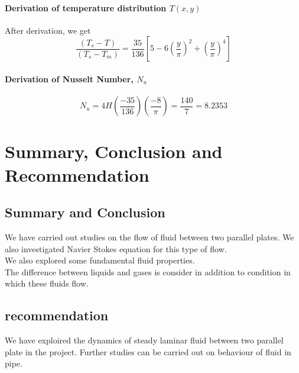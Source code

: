 \documentclass[12pt]{report}
\newcommand{\sps}{\\[0.2cm]}
\begin{document}
	\subsubsection{Derivation of temperature distribution $T(x,y)$}
	After derivation, we get
	\begin{equation*}
		\frac{(T_s - T)}{(T_s - T_m)} = \frac{35}{136}\left[5 - 6\left(\frac{y}{\pi}\right)^2 + \left(\frac{y}{\pi}\right)^4\right]
	\end{equation*}
	
	\subsubsection{Derivation of Nusselt Number, $N_u$}
	\begin{equation*}
		N_u = 4H\left(\frac{-35}{136}\right)\left(\frac{-8}{\pi}\right) = \frac{140}{7} = 8.2353
	\end{equation*}
	
	
		
	\chapter{Summary, Conclusion and Recommendation}
	\section{Summary and Conclusion}
	We have carried out studies on the flow of fluid between two parallel plates. We also investigated Navier Stokes equation for this type of flow.\sps
	We also explored some fundamental fluid properties.\sps
	The difference between liquids and gases is consider in addition to condition in which these fluids flow.
	
	\section{recommendation}
	We have exploired the dynamics of steady laminar fluid between two parallel plate in the project. Further studies can be carried out on behaviour of fluid in pipe.
	
	
	
	
\end{document}
